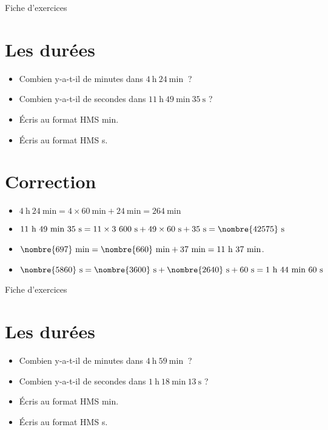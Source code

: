 \documentclass[a4paper,11pt,fleqn]{article}
\begin{document}
\newpage
\setcounter{exo}{0}
\setcounter{section}{0}
\begin{center}
	{\huge Fiche d'exercices } 	
\end{center}


\section{Les durées}
\begin{itemize}
  \item Combien y-a-t-il de minutes dans $4~\text{h}~24~\text{min}~$ ?
  \item Combien y-a-t-il de secondes dans $11~\text{h}~49~\text{min}~35~\text{s}$ ?
  \item Écris au format HMS  min.
  \item Écris au format HMS  s.
\end{itemize}

\section{Correction}
\begin{itemize}
 \item $4~\text{h}~24~\text{min}=4\times60~\text{min}+24~\text{min}=264~\text{min}$
  \item $11~\text{h}~49~\text{min}~35~\text{s}=11\times3~600~\text{s}+49\times60~\text{s}+35~\text{s}=\nombre{42575}~\text{s}$
  \item $\nombre{697}~\text{min}=\nombre{660}~\text{min}+37~\text{min}=11~\text{h}~37~\text{min}$.
  \item $\nombre{5860}~\text{s}=\nombre{3600}~\text{s}+\nombre{2640}~\text{s}+60~\text{s}=1~\text{h}~44~\text{min}~60~\text{s}$ \end{itemize}


\newpage
\setcounter{exo}{0}
\setcounter{section}{0}
\begin{center}
	{\huge Fiche d'exercices } 	
\end{center}


\section{Les durées}
\begin{itemize}
  \item Combien y-a-t-il de minutes dans $4~\text{h}~59~\text{min}~$ ?
  \item Combien y-a-t-il de secondes dans $1~\text{h}~18~\text{min}~13~\text{s}$ ?
  \item Écris au format HMS  min.
  \item Écris au format HMS  s.
\end{itemize}
\end{document}
